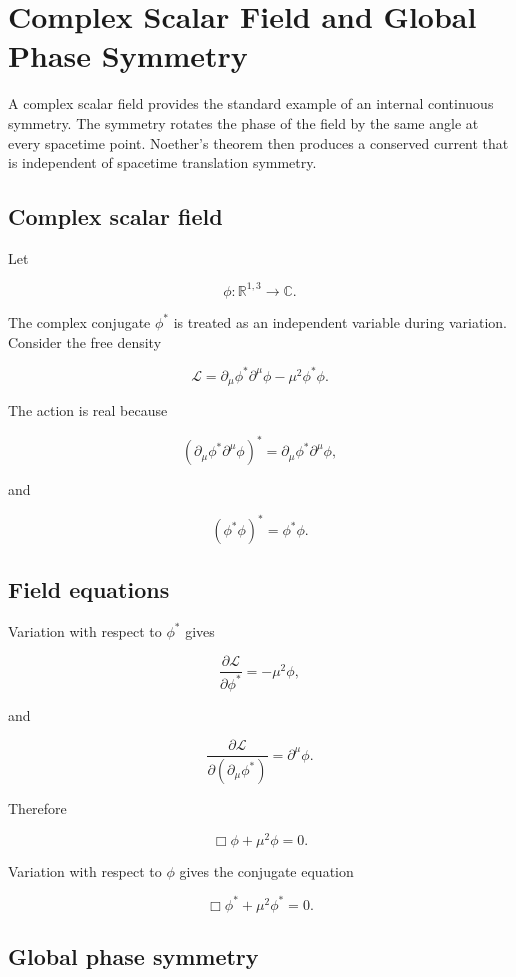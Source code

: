 \section{Complex Scalar Field and Global Phase Symmetry}
\label{sec:complex_scalar_phase_symmetry}

A complex scalar field provides the standard example of an internal continuous symmetry. The symmetry rotates the phase of the field by the same angle at every spacetime point. Noether's theorem then produces a conserved current that is independent of spacetime translation symmetry.

\subsection{Complex scalar field}

Let

\[
\phi:
\mathbb{R}^{1,3}
\longrightarrow
\mathbb{C}.
\]

The complex conjugate \(\phi^{*}\) is treated as an independent variable during variation. Consider the free density

\[
\boxed{
\mathcal{L}
=
\partial_{\mu}\phi^{*}
\partial^{\mu}\phi
-
\mu^{2}\phi^{*}\phi
}.
\]

The action is real because

\[
\left(
\partial_{\mu}\phi^{*}
\partial^{\mu}\phi
\right)^{*}
=
\partial_{\mu}\phi^{*}
\partial^{\mu}\phi,
\]

and

\[
\left(
\phi^{*}\phi
\right)^{*}
=
\phi^{*}\phi.
\]

\subsection{Field equations}

Variation with respect to \(\phi^{*}\) gives

\[
\frac{\partial\mathcal{L}}
{\partial\phi^{*}}
=
-\mu^{2}\phi,
\]

and

\[
\frac{\partial\mathcal{L}}
{\partial(\partial_{\mu}\phi^{*})}
=
\partial^{\mu}\phi.
\]

Therefore

\[
\boxed{
\Box\phi+\mu^{2}\phi=0
}.
\]

Variation with respect to \(\phi\) gives the conjugate equation

\[
\boxed{
\Box\phi^{*}+\mu^{2}\phi^{*}=0
}.
\]

\subsection{Global phase symmetry}


